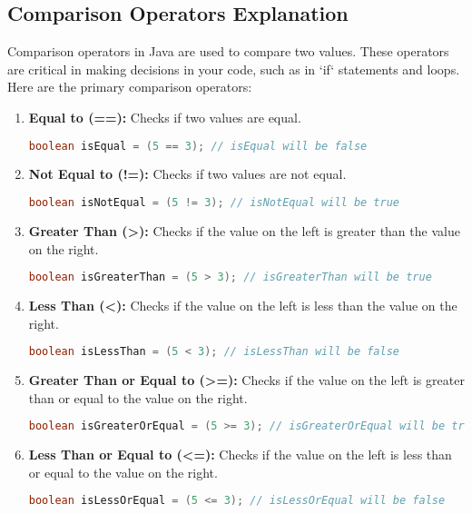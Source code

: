 \documentclass{article}
\begin{document}
\newpage
\subsection{Comparison Operators Explanation}

Comparison operators in Java are used to compare two values. These operators are critical in making decisions in your code, such as in `if` statements and loops. Here are the primary comparison operators:

\begin{enumerate}
  \item \textbf{Equal to (==):}
  Checks if two values are equal.
  \begin{lstlisting}[language=Java]
boolean isEqual = (5 == 3); // isEqual will be false
  \end{lstlisting}

  \item \textbf{Not Equal to (!=):}
  Checks if two values are not equal.
  \begin{lstlisting}[language=Java]
boolean isNotEqual = (5 != 3); // isNotEqual will be true
  \end{lstlisting}

  \item \textbf{Greater Than (>):}
  Checks if the value on the left is greater than the value on the right.
  \begin{lstlisting}[language=Java]
boolean isGreaterThan = (5 > 3); // isGreaterThan will be true
  \end{lstlisting}

  \item \textbf{Less Than (<):}
  Checks if the value on the left is less than the value on the right.
  \begin{lstlisting}[language=Java]
boolean isLessThan = (5 < 3); // isLessThan will be false
  \end{lstlisting}

  \item \textbf{Greater Than or Equal to (>=):}
  Checks if the value on the left is greater than or equal to the value on the right.
  \begin{lstlisting}[language=Java]
boolean isGreaterOrEqual = (5 >= 3); // isGreaterOrEqual will be true
  \end{lstlisting}

  \item \textbf{Less Than or Equal to (<=):}
  Checks if the value on the left is less than or equal to the value on the right.
  \begin{lstlisting}[language=Java]
boolean isLessOrEqual = (5 <= 3); // isLessOrEqual will be false
  \end{lstlisting}
\end{enumerate}
\end{document}
